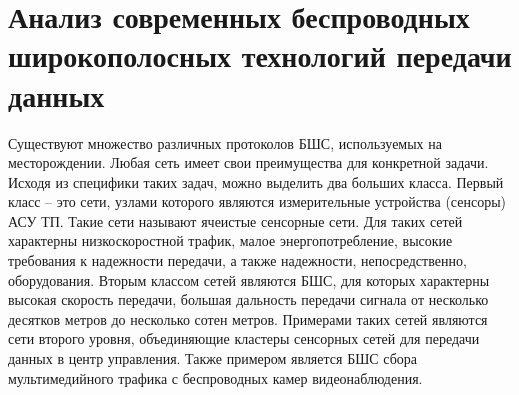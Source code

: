 \section{Анализ современных беспроводных широкополосных технологий 
передачи данных}







Существуют множество различных протоколов БШС, используемых на месторождении. Любая сеть имеет свои преимущества для конкретной задачи. Исходя из специфики таких задач, можно выделить два больших класса. Первый класс -- это сети, узлами которого являются измерительные устройства (сенсоры) АСУ ТП. Такие сети называют  ячеистые сенсорные сети. Для таких сетей характерны низкоскоростной трафик, малое энергопотребление, высокие требования к надежности передачи, а также надежности, непосредственно,  оборудования. Вторым классом сетей являются БШС, для которых  характерны высокая скорость передачи, большая дальность передачи сигнала от несколько десятков метров до несколько сотен метров. Примерами таких сетей являются сети второго уровня, объединяющие кластеры сенсорных сетей для передачи данных в центр управления. Также примером является БШС сбора мультимедийного трафика с беспроводных камер видеонаблюдения. 



